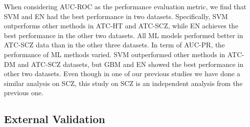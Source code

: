     When considering AUC-ROC as the performance evaluation metric, we find that SVM and EN had the best performance in two datasets. Specifically, SVM outperforms other methods in ATC-HT and ATC-SCZ, while EN achieves the best performance in the other two datasets. All ML models performed better in ATC-SCZ data than in the other three datasets. In term of AUC-PR, the performance of  ML methods varied. SVM outperformed other methods in ATC-DM and ATC-SCZ datasets, but GBM and EN showed the best performance in other two datasets. Even though in one of our previous studies \cite{zhao2018drug} we have done a similar analysis on SCZ, this study on SCZ is an independent analysis from the previous one. 

  \subsection{External Validation}  
